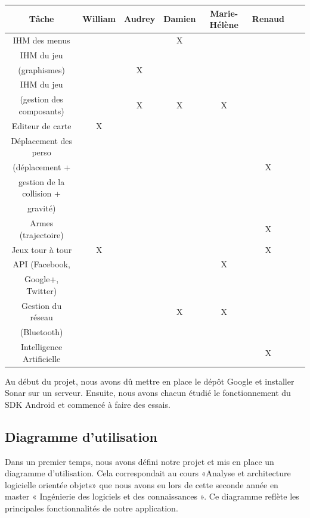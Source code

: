 \documentclass{report}
\begin{document}
\begin{tabular}{|c|c|c|c|c|c|c|c|}
\hline
{\bf Tâche } & {\bf William } & {\bf Audrey } & {\bf Damien } & {\bf Marie-Hélène } & {\bf Renaud }\\
\hline
{IHM des menus} & {} & {} & {X} & {} & {}\\
\hline
{IHM du jeu} & {} & {} & {} & {} & {} \\
{(graphismes)} & {} & {X} & {} & {} & {} \\
\hline
{IHM du jeu} & {} & {} & {} & {} & {}\\
{(gestion des composants)} & {} & {X} & {X} & {X} & {} \\
\hline
{Editeur de carte} & {X} & {} & {} & {} & {} \\
\hline
Déplacement des perso &&&&&\\
(déplacement + &&&&& X\\
gestion de la collision + &&&&&\\
 gravité) &&&&&\\
\hline
{Armes (trajectoire)} & {} & {} & {} & {} & {X} \\
\hline
{Jeux tour à tour} & {X} & {} & {} & {} & {X} \\
\hline
{API (Facebook,} & {} & {} & {} & {X} & {} \\
{ Google+, Twitter)} & {} & {} & {} & {} & {} \\
\hline
{Gestion du réseau} & {} & {} & {X} & {X} & {} \\
{(Bluetooth)} & {} & {} & {} & {} & {} \\
\hline
{Intelligence Artificielle} & {} & {} & {} & {} & {X}\\
\hline
\end{tabular}
\bigskip


Au début du projet, nous avons dû mettre en place le dépôt Google et
installer Sonar sur un serveur. Ensuite, nous avons chacun étudié le
fonctionnement du SDK Android et commencé à faire des essais.

\subsection{Diagramme d’utilisation}
\bigskip


Dans un premier temps, nous avons défini notre projet et mis en place un
diagramme d’utilisation. Cela correspondait au cours «Analyse et
architecture logicielle orientée objets» que nous avons eu lors de cette
seconde année en master « Ingénierie des logiciels et des
connaissances ». Ce diagramme reflète les principales fonctionnalités
de notre application.
\end{document}

